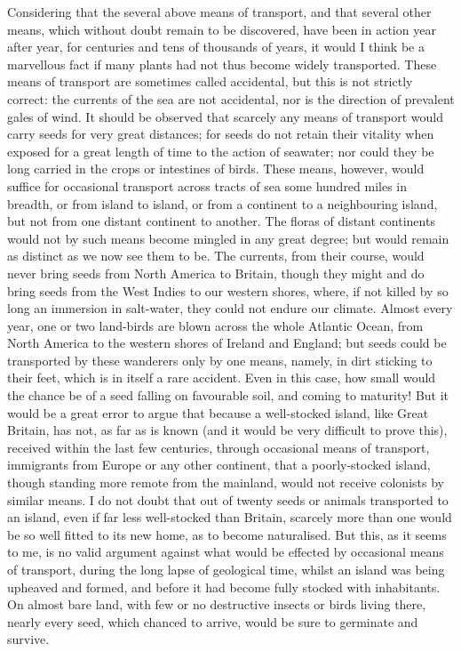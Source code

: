 \indent Considering that the several above means of transport, and that several other means, which without doubt remain to be discovered, have been in action year after year, for centuries and tens of thousands of years, it would I think be a marvellous fact if many plants had not thus become widely transported. These means of transport are sometimes called accidental, but this is not strictly correct: the currents of the sea are not accidental, nor is the direction of prevalent gales of wind. It should be observed that scarcely any means of transport would carry seeds for very great distances; for seeds do not retain their vitality when exposed for a great length of time to the action of seawater; nor could they be long carried in the crops or intestines of birds. These means, however, would suffice for occasional transport across tracts of sea some hundred miles in breadth, or from island to island, or from a continent to a neighbouring island, but not from one distant continent to another. The floras of distant continents would not by such means become mingled in any great degree; but would remain as distinct as we now see them to be. The currents, from their course, would never bring seeds from North America to Britain, though they might and do bring seeds from the West Indies to our western shores, where, if not killed by so long an immersion in salt-water, they could not endure our climate. Almost every year, one or two land-birds are blown across the whole Atlantic Ocean, from North America to the western shores of Ireland and England; but seeds could be transported by these wanderers only by one means, namely, in dirt sticking to their feet, which is in itself a rare accident. Even in this case, how small would the chance be of a seed falling on favourable soil, and coming to maturity!  But it would be a great error to argue that because a well-stocked island, like Great Britain, has not, as far as is known (and it would be very difficult to prove this), received within the last few centuries, through occasional means of transport, immigrants from Europe or any other continent, that a poorly-stocked island, though standing more remote from the mainland, would not receive colonists by similar means. I do not doubt that out of twenty seeds or animals transported to an island, even if far less well-stocked than Britain, scarcely more than one would be so well fitted to its new home, as to become naturalised. But this, as it seems to me, is no valid argument against what would be effected by occasional means of transport, during the long lapse of geological time, whilst an island was being upheaved and formed, and before it had become fully stocked with inhabitants. On almost bare land, with few or no destructive insects or birds living there, nearly every seed, which chanced to arrive, would be sure to germinate and survive.~\\

